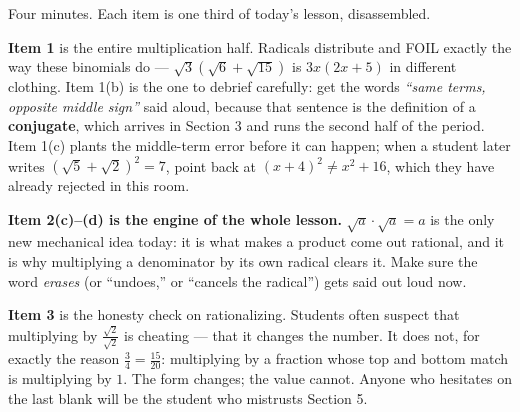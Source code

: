 \documentclass[10pt]{article}
\begin{document}
\begin{teachernote}
Four minutes. Each item is one third of today's lesson, disassembled.

\textbf{Item 1} is the entire multiplication half. Radicals distribute and FOIL exactly the way
these binomials do --- $\sqrt3\left(\sqrt6+\sqrt{15}\right)$ is $3x(2x+5)$ in different clothing.
Item 1(b) is the one to debrief carefully: get the words \emph{``same terms, opposite middle
sign''} said aloud, because that sentence is the definition of a \textbf{conjugate}, which arrives
in Section 3 and runs the second half of the period. Item 1(c) plants the middle-term error before
it can happen; when a student later writes $\left(\sqrt5+\sqrt2\right)^{2}=7$, point back at
$(x+4)^{2}\ne x^{2}+16$, which they have already rejected in this room.

\textbf{Item 2(c)--(d) is the engine of the whole lesson.} $\sqrt a\cdot\sqrt a=a$ is the only new
mechanical idea today: it is what makes a product come out rational, and it is why multiplying a
denominator by its own radical clears it. Make sure the word \emph{erases} (or ``undoes,'' or
``cancels the radical'') gets said out loud now.

\textbf{Item 3} is the honesty check on rationalizing. Students often suspect that multiplying by
$\frac{\sqrt2}{\sqrt2}$ is cheating --- that it changes the number. It does not, for exactly the
reason $\frac{3}{4}=\frac{15}{20}$: multiplying by a fraction whose top and bottom match is
multiplying by $1$. The form changes; the value cannot. Anyone who hesitates on the last blank will
be the student who mistrusts Section 5.
\end{teachernote}
\end{document}
